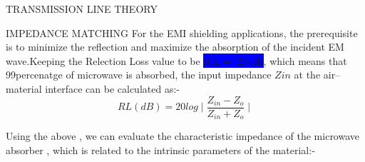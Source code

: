 \documentclass[11pt,aspect ratio=169]{beamer}
\begin{document}
\begin{frame}[t]{TRANSMISSION LINE THEORY}
	\begin{block}{IMPEDANCE MATCHING}
For the EMI shielding applications, the prerequisite is to minimize the reflection and maximize the absorption of the incident EM wave.Keeping the Relection Loss value to be \colorbox{blue}{R.L = -20 dB}, which means that 99percenatge of microwave is absorbed, the input impedance $Zin$ at the air–material interface can be calculated as:-
\begin{equation}
RL(dB) = 20 log\mid{\dfrac{Z_{in}- Z_o}{Z_{in}+ Z_o}}\mid
\end{equation}


Using the above , we can evaluate the characteristic impedance of the microwave absorber , which is related to the intrinsic parameters of the material:-

\end{block}

\end{frame}
\end{document}
